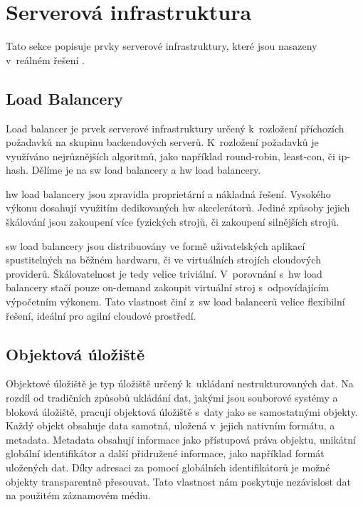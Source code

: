\section{Serverová infrastruktura}
\label{sub:server-architecture}

Tato sekce popisuje prvky serverové infrastruktury, které jsou nasazeny v~reálném řešení \bso. 

\label{sub:load-balancing}
\subsection{Load Balancery}

Load balancer\cite{load-balancer} je prvek serverové infrastruktury určený k~rozložení příchozích požadavků na skupinu backendových serverů. K~rozložení požadavků je využíváno nejrůznějších algoritmů, jako například \gls{round-robin}, \gls{least-con}, či \gls{ip-hash}. Dělíme je na \acrshort{sw} load balancery a \acrshort{hw} load balancery. 

\acrshort{hw} load balancery jsou zpravidla proprietární a nákladná řešení. Vysokého výkonu dosahují využitím dedikovaných \acrshort{hw} akcelerátorů. Jediné způsoby jejich škálování jsou zakoupení více fyzických strojů, či zakoupení silnějších strojů.

\acrshort{sw} load balancery jsou distribuovány ve formě uživatelských aplikací spustitelných na běžném hardwaru, či ve virtuálních strojích cloudových providerů. Škálovatelnost je tedy velice triviální. V~porovnání s~\acrshort{hw} load balancery stačí pouze \gls{on-demand} zakoupit virtuální stroj s~odpovídajícím výpočetním výkonem.  Tato vlastnost činí z~\acrshort{sw} load balancerů velice flexibilní řešení, ideální pro agilní cloudové prostředí.

\subsection{Objektová úložiště}

Objektové úložiště je typ úložiště určený k~ukládaní nestrukturovaných dat. Na rozdíl od tradičních způsobů ukládání dat, jakými jsou souborové systémy a bloková úložiště, pracují objektová úložiště\cite{object-storage} s~daty jako se samostatnými objekty. Každý objekt obsahuje data samotná, uložená v~jejich nativním formátu, a metadata. Metadata obsahují informace jako přístupová práva objektu, unikátní globální identifikátor a další přidružené informace, jako například formát uložených dat. Díky adresaci za pomocí globálních identifikátorů je možné objekty transparentně přesouvat. Tato vlastnost nám poskytuje nezávislost dat na použitém záznamovém médiu.

